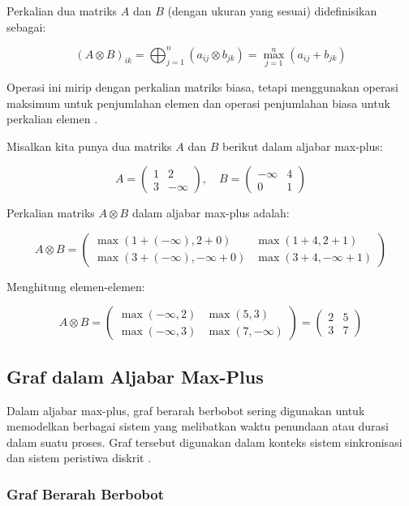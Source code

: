 \documentclass[12pt]{article}
\numberwithin{lemma}{subsection}
\begin{document}
Perkalian dua matriks \( A \) dan \( B \) (dengan ukuran yang sesuai) didefinisikan sebagai:

\[
(A \otimes B)_{ik} = \bigoplus_{j=1}^n (a_{ij} \otimes b_{jk}) = \max_{j=1}^n (a_{ij} + b_{jk})
\]

Operasi ini mirip dengan perkalian matriks biasa, tetapi menggunakan operasi maksimum untuk penjumlahan elemen dan operasi penjumlahan biasa untuk perkalian elemen \citep{butkovic2010maxplus}.

Misalkan kita punya dua matriks \( A \) dan \( B \) berikut dalam aljabar max-plus:

\[
A = \begin{pmatrix} 1 & 2 \\ 3 & -\infty \end{pmatrix}, \quad B = \begin{pmatrix} -\infty & 4 \\ 0 & 1 \end{pmatrix}
\]

Perkalian matriks \( A \otimes B \) dalam aljabar max-plus adalah:

\[
A \otimes B = \begin{pmatrix} \max(1 + (-\infty), 2 + 0) & \max(1 + 4, 2 + 1) \\ \max(3 + (-\infty), -\infty + 0) & \max(3 + 4, -\infty + 1) \end{pmatrix}
\]

Menghitung elemen-elemen:

\[
A \otimes B = \begin{pmatrix} \max(-\infty, 2) & \max(5, 3) \\ \max(-\infty, 3) & \max(7, -\infty) \end{pmatrix}
= \begin{pmatrix} 2 & 5 \\ 3 & 7 \end{pmatrix}
\]

\subsection{Graf dalam Aljabar Max-Plus}

Dalam aljabar max-plus, graf berarah berbobot sering digunakan untuk memodelkan berbagai sistem yang melibatkan waktu penundaan atau durasi dalam suatu proses. Graf tersebut digunakan dalam konteks sistem sinkronisasi dan sistem peristiwa diskrit \cite{heidergott}.

\subsubsection{Graf Berarah Berbobot}
\end{document}
